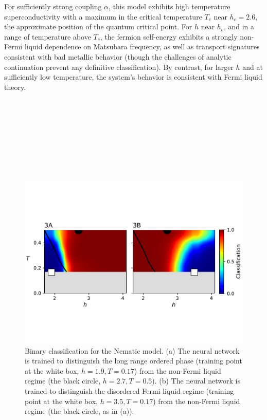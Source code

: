 \documentclass[amsmath,amssymb, aps, prx, longbibliography, twocolumn]{revtex4-1}
\begin{document}
For sufficiently strong coupling $\alpha$, this model exhibits high temperature superconductivity with a maximum in the critical temperature $T_{c}$ near $h_{c} = 2.6$, the approximate position of the quantum critical point. For $h$ near $h_{c}$, and in a range of temperature above $T_{c}$, the fermion self-energy exhibits a strongly non-Fermi liquid dependence on Matsubara frequency, as well as transport signatures consistent with bad metallic behavior (though the challenges of analytic continuation prevent any definitive classification). By contrast, for larger $h$ and at sufficiently low temperature, the system's behavior is consistent with Fermi liquid theory.
\\
\\
\\
\\
\\
\\
\\
\\
\\

\begin{figure} [t]
    \centering
    \includegraphics[width=.45\textwidth, trim={0 2.5cm 0 3cm}, clip]{2pt_nematic.pdf}
    \caption{Binary classification for the Nematic model. (a) The neural network is trained to distinguish the long range ordered phase (training point at the white box, $h=1.9,T=0.17$) from the non-Fermi liquid regime (the black circle, $h=2.7,T=0.5$). (b) The neural network is trained to distinguish the disordered Fermi liquid regime (training point at the white box, $h=3.5,T=0.17$) from the non-Fermi liquid regime (the black circle, as in (a)).}
    \label{fig:2ptnem}
\end{figure}
\end{document}
